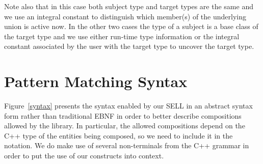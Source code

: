 \documentclass[preprint]{sigplanconf}
\begin{document}
Note also that in this case both subject type and target types are the same and 
we use an integral constant to distinguish which member(s) of the underlying union 
is active now. In the other two cases the type of a subject is a base class of 
the target type and we use either run-time type information or the integral 
constant associated by the user with the target type to uncover the target type. 

\section{Pattern Matching Syntax}
\label{sec:syn}

Figure~\ref{syntax} presents the syntax enabled by our SELL in an abstract 
syntax form rather than traditional EBNF in order to better describe 
compositions allowed by the library. In particular, the allowed compositions 
depend on the C++ type of the entities being composed, so we need to include it 
in the notation. We do make use of several non-terminals from the C++ grammar in 
order to put the use of our constructs into context.

\end{document}
